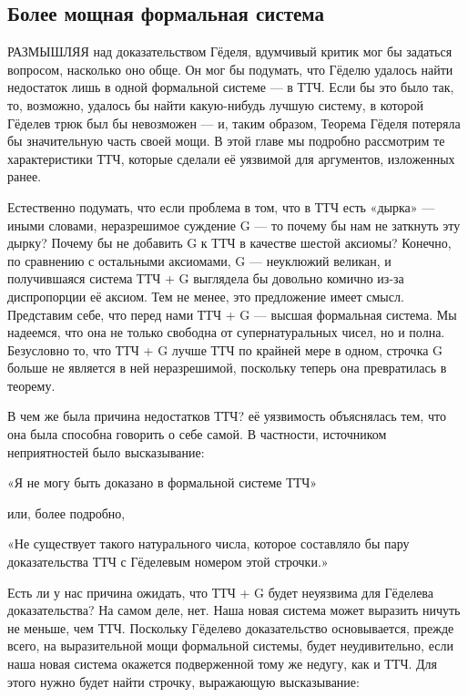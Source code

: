 \documentclass[../main.tex]{subfiles}
\begin{document}

\subsection{Более мощная формальная система}

РАЗМЫШЛЯЯ над доказательством Гёделя, вдумчивый критик мог бы задаться вопросом, насколько оно обще. Он мог бы подумать, что Гёделю удалось найти недостаток лишь в одной формальной системе --- в ТТЧ. Если бы это было так, то, возможно, удалось бы найти какую-нибудь лучшую систему, в которой Гёделев трюк был бы невозможен --- и, таким образом, Теорема Гёделя потеряла бы значительную часть своей мощи. В этой главе мы подробно рассмотрим те характеристики ТТЧ, которые сделали её уязвимой для аргументов, изложенных ранее.

Естественно подумать, что если проблема в том, что в ТТЧ есть «дырка» --- иными словами, неразрешимое суждение G --- то почему бы нам не заткнуть эту дырку? Почему бы не добавить G к ТТЧ в качестве шестой аксиомы? Конечно, по сравнению с остальными аксиомами, G --- неуклюжий великан, и получившаяся система ТТЧ + G выглядела бы довольно комично из-за диспропорции её аксиом. Тем не менее, это предложение имеет смысл. Представим себе, что перед нами ТТЧ + G --- высшая формальная система. Мы надеемся, что она не только свободна от супернатуральных чисел, но и полна. Безусловно то, что ТТЧ + G лучше ТТЧ по крайней мере в одном, строчка G больше не является в ней неразрешимой, поскольку теперь она превратилась в теорему.

В чем же была причина недостатков ТТЧ? её уязвимость объяснялась тем, что она была способна говорить о себе самой. В частности, источником неприятностей было высказывание:

«Я не могу быть доказано в формальной системе ТТЧ»

или, более подробно,

«Не существует такого натурального числа, которое составляло бы пару доказательства ТТЧ с Гёделевым номером этой строчки.»

Есть ли у нас причина ожидать, что ТТЧ + G будет неуязвима для Гёделева доказательства? На самом деле, нет. Наша новая система может выразить ничуть не меньше, чем ТТЧ. Поскольку Гёделево доказательство основывается, прежде всего, на выразительной мощи формальной системы, будет неудивительно, если наша новая система окажется подверженной тому же недугу, как и ТТЧ. Для этого нужно будет найти строчку, выражающую высказывание:
\end{document}
